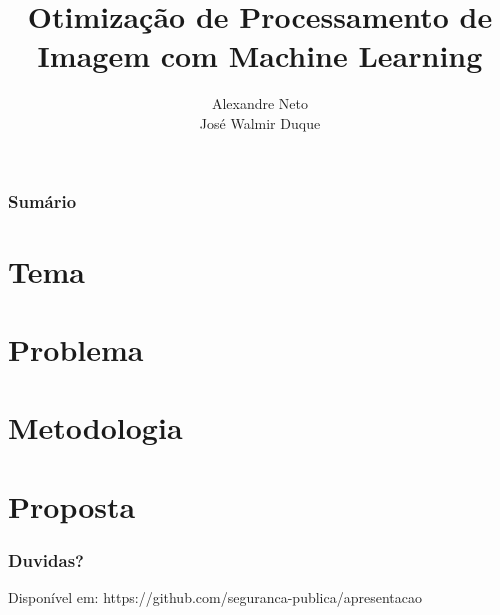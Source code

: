 \documentclass[14pt]{beamer}
\author{Alexandre Neto\\
		José Walmir Duque}
\title{Otimização de Processamento de Imagem com Machine Learning}
\institute{
	Análise e Desenvolvimento de Sistemas\\
	Fatec-SJC
	}
\begin{document}
\begin{frame}
\titlepage
\end{frame}

\begin{frame}
\frametitle{Sumário}
\tableofcontents
\end{frame}

\section{Tema}


\section{Problema}


\section{Metodologia}


\section{Proposta}


\begin{frame}
	\frametitle{Duvidas?}
	Disponível em:
	https://github.com/seguranca-publica/apresentacao
\end{frame}

	
\end{document}
